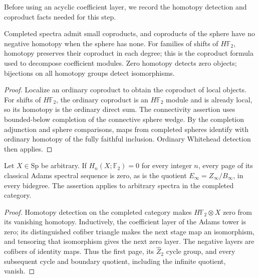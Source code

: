Before using an acyclic coefficient layer, we record the homotopy
detection and coproduct facts needed for this step.

\begin{theorem}
\label{sem:AdamsSynthetic:completed-coproducts}
Completed spectra admit small coproducts, and coproducts of the sphere have no negative homotopy when the sphere has none. For families of shifts of $H\mathbb F_2$, homotopy preserves their coproduct in each degree; this is the coproduct formula used to decompose coefficient modules. Zero homotopy detects zero objects; bijections on all homotopy groups detect isomorphisms.
\end{theorem}
\begin{proof}
Localize an ordinary coproduct to obtain the coproduct of local objects. For shifts of $H\mathbb F_2$, the ordinary coproduct is an $H\mathbb F_2$ module and is already local, so its homotopy is the ordinary direct sum. The connectivity assertion uses bounded-below completion of the connective sphere wedge. By the completion adjunction and sphere comparisons, maps from completed spheres identify with ordinary homotopy of the fully faithful inclusion. Ordinary Whitehead detection then applies.
\end{proof}

\begin{theorem}
\label{sem:AdamsSynthetic:acyclic-adams-vanishing}
Let $X\in\mathrm{Sp}$ be arbitrary. If $H_n(X;\mathbb F_2)=0$ for
every integer $n$, every page of its classical Adams spectral
sequence is zero, as is the quotient $E_\infty=Z_\infty/B_\infty$,
in every bidegree. The assertion applies to arbitrary spectra in the completed category.
\end{theorem}
\begin{proof}
Homotopy detection on the completed category makes $H\mathbb F_2\otimes X$ zero from its vanishing homotopy. Inductively, the coefficient layer of the Adams tower is zero;
its distinguished cofiber triangle makes the next stage map an
isomorphism, and tensoring that isomorphism gives the next zero layer.
The negative layers are cofibers of identity maps. Thus the
first page, its $\widehat Z_2$ cycle group, and every subsequent cycle and
boundary quotient, including the infinite quotient, vanish.
\end{proof}

